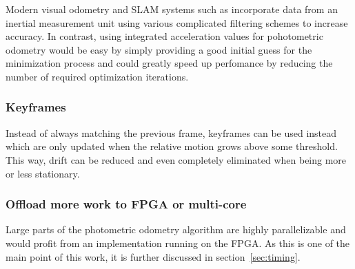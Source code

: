 Modern visual odometry and SLAM systems such as \cite{leutenegger2013keyframe}
incorporate data from an inertial measurement unit using various complicated
filtering schemes to increase accuracy.
In contrast, using integrated acceleration values for pohotometric odometry
would be easy by simply providing a good initial guess for the minimization
process and could greatly speed up perfomance by reducing the number of
required optimization iterations.

\subsubsection{Keyframes}

Instead of always matching the previous frame, keyframes can be used instead
which are only updated when the relative motion grows above some threshold.
This way, drift can be reduced and even completely eliminated when being more
or less stationary.

\subsubsection{Offload more work to FPGA or multi-core}

Large parts of the photometric odometry algorithm are highly parallelizable and
would profit from an implementation running on the FPGA. As this is one of the
main point of this work, it is further discussed in section~\ref{sec:timing}.
